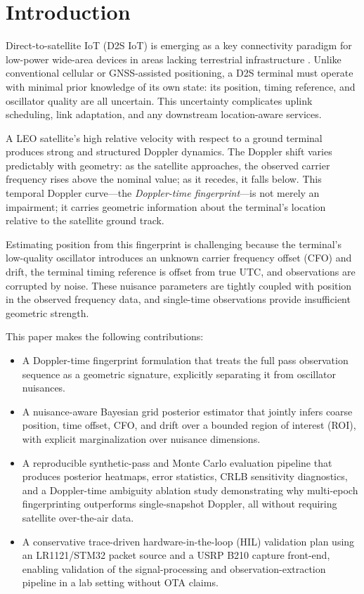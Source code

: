 \section{Introduction}

Direct-to-satellite IoT (D2S IoT) is emerging as a key connectivity paradigm for
low-power wide-area devices in areas lacking terrestrial infrastructure
\cite{kodheli_nb_iot_2021}.  Unlike conventional cellular or GNSS-assisted positioning,
a D2S terminal must operate with minimal prior knowledge of its own state: its
position, timing reference, and oscillator quality are all uncertain.  This
uncertainty complicates uplink scheduling, link adaptation, and any downstream
location-aware services.

A LEO satellite's high relative velocity with respect to a ground terminal
produces strong and structured Doppler dynamics.  The Doppler shift varies
predictably with geometry: as the satellite approaches, the observed carrier
frequency rises above the nominal value; as it recedes, it falls below.  This
temporal Doppler curve---the \emph{Doppler-time fingerprint}---is not merely an
impairment; it carries geometric information about the terminal's location
relative to the satellite ground track.

Estimating position from this fingerprint is challenging because the terminal's
low-quality oscillator introduces an unknown carrier frequency offset (CFO) and
drift, the terminal timing reference is offset from true UTC, and observations
are corrupted by noise.  These nuisance parameters are tightly coupled with
position in the observed frequency data, and single-time observations provide
insufficient geometric strength.

This paper makes the following contributions:

\begin{itemize}
  \item A Doppler-time fingerprint formulation that treats the full pass
        observation sequence as a geometric signature, explicitly separating
        it from oscillator nuisances.
  \item A nuisance-aware Bayesian grid posterior estimator that jointly
        infers coarse position, time offset, CFO, and drift over a bounded
        region of interest (ROI), with explicit marginalization over nuisance
        dimensions.
  \item A reproducible synthetic-pass and Monte Carlo evaluation pipeline
        that produces posterior heatmaps, error statistics, CRLB sensitivity
        diagnostics, and a Doppler-time ambiguity ablation study demonstrating
        why multi-epoch fingerprinting outperforms single-snapshot Doppler,
        all without requiring satellite over-the-air data.
  \item A conservative trace-driven hardware-in-the-loop (HIL) validation plan
        using an LR1121/STM32 packet source and a USRP B210 capture front-end,
        enabling validation of the signal-processing and observation-extraction
        pipeline in a lab setting without OTA claims.
\end{itemize}

